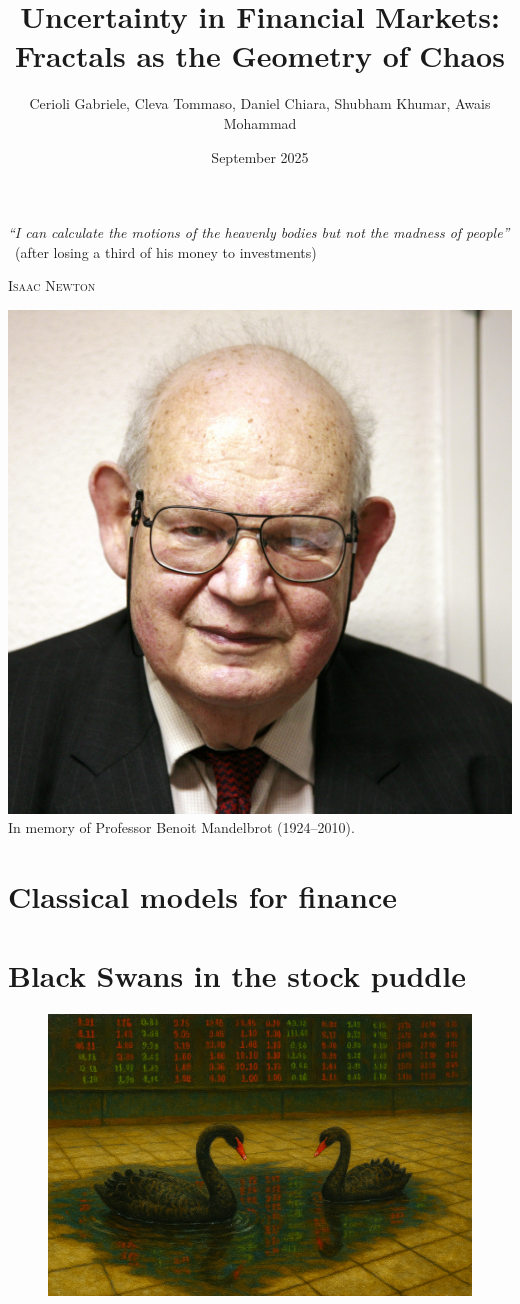 \documentclass[english]{article}
\title{Uncertainty in Financial Markets: Fractals as the Geometry of Chaos}
\author{Cerioli Gabriele, Cleva Tommaso, Daniel Chiara, Shubham Khumar, Awais Mohammad}
\date{September 2025}
\begin{document}
\maketitle

\vspace{1cm}
\begin{center}
    \epigraph{\large\textit{“I can calculate the motions of the heavenly bodies but not the madness of people”}%
    \normalsize\ (after losing a third of his money to investments)}%
    {\large\scshape Isaac Newton}
\end{center}


\vfill
\begin{center}
    \includegraphics[width=0.35\linewidth]{img/mandelbrot.jpg}\\[0.3cm]
    \small In memory of Professor Benoit Mandelbrot (1924--2010).
\end{center}


\newpage
\tableofcontents

\newpage
\section{Classical models for finance}


\section{Black Swans in the stock puddle}

\begin{figure} [H]
    \centering
    \includegraphics[width=0.65\linewidth]{img/Copilot_20250925_235000.png}
\end{figure}

\end{document}
